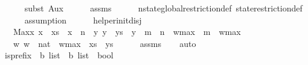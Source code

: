 \begin{isabellebody}
\ \ \ \ \isamarkupfalse%
\ {\isacharparenleft}{\kern0pt}subst\ Aux{\isacharparenright}{\kern0pt}\isanewline
\ \ \ \ \isamarkupfalse%
\ assms{\isacharparenleft}{\kern0pt}{}{\isacharparenright}{\kern0pt}\isanewline
\ \ \ \ \isamarkupfalse%
\ nstate{\isacharunderscore}{\kern0pt}global{\isacharunderscore}{\kern0pt}restriction{\isacharunderscore}{\kern0pt}def\ state{\isacharunderscore}{\kern0pt}restriction{\isacharunderscore}{\kern0pt}def\isanewline
\ \ \ \ \isamarkupfalse%
\ assumption\isanewline
\ \ \ \ \isamarkupfalse%
\isanewline
{}\isamarkupfalse%
%
\endisatagproof
{\isafoldproof}%
%
\isadelimproof
\isanewline
%
\endisadelimproof
\isanewline
{}\isamarkupfalse%
\isanewline
\isanewline
\isanewline
{}\isamarkupfalse%
\ helper{\isacharunderscore}{\kern0pt}init{\isacharunderscore}{\kern0pt}disj{\isacharcolon}{\kern0pt}\isanewline
\ \ \ Max{}{\isacharcolon}{\kern0pt}{\isachardoublequoteopen}{\isasymforall}x{\isachardot}{\kern0pt}\ x\ {\isasymin}\ xs\ {\isasymlongrightarrow}\ x\ {\isasymle}\ n{\isachardoublequoteclose}\ \ {\isachardoublequoteopen}{\isasymforall}y{\isachardot}{\kern0pt}\ y\ {\isasymin}\ ys\ {\isasymlongrightarrow}\ y\ {\isasymle}\ m{\isachardoublequoteclose}\ \ {\isachardoublequoteopen}n\ {\isacharless}{\kern0pt}\ w{\isacharunderscore}{\kern0pt}max{\isachardoublequoteclose}\ \ {\isachardoublequoteopen}m\ {\isacharless}{\kern0pt}\ w{\isacharunderscore}{\kern0pt}max{\isachardoublequoteclose}\isanewline
\ \ \ {\isachardoublequoteopen}{\isacharbraceleft}{\kern0pt}w{\isachardot}{\kern0pt}\ {\isacharparenleft}{\kern0pt}w\ {\isacharcolon}{\kern0pt}{\isacharcolon}{\kern0pt}\ nat{\isacharparenright}{\kern0pt}\ {\isasymge}\ w{\isacharunderscore}{\kern0pt}max{\isacharbraceright}{\kern0pt}\ {\isasyminter}\ {\isacharparenleft}{\kern0pt}xs\ {\isasymunion}\ ys{\isacharparenright}{\kern0pt}\ {\isacharequal}{\kern0pt}\ {\isacharbraceleft}{\kern0pt}{\isacharbraceright}{\kern0pt}{\isachardoublequoteclose}\isanewline
%
\isadelimproof
\ \ %
\endisadelimproof
%
\isatagproof
{}\isamarkupfalse%
\ assms\isanewline
\ \ \isamarkupfalse%
\ auto%
\endisatagproof
{\isafoldproof}%
%
\isadelimproof
\isanewline
%
\endisadelimproof
\ \isanewline
{}\isamarkupfalse%
\ is{\isacharunderscore}{\kern0pt}prefix\ {\isacharcolon}{\kern0pt}{\isacharcolon}{\kern0pt}\ {\isachardoublequoteopen}{\isacharprime}{\kern0pt}b\ list\ {\isasymRightarrow}\ {\isacharprime}{\kern0pt}b\ list\ {\isasymRightarrow}\ bool{\isachardoublequoteclose}\isanewline

\end{isabellebody}
